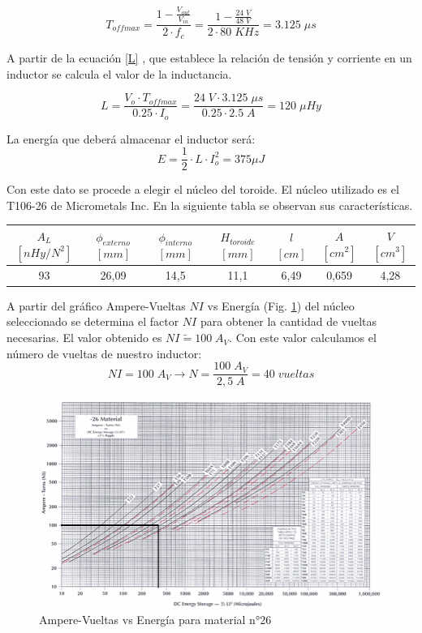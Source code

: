 \documentclass[11pt, a4paper]{article}
\begin{document}
\begin{equation}
T_{offmax} = \frac{1 - \frac{V_{out}}{V_{in}}}{2\cdot f_c} = \frac{1 - \frac{24 \; V}{48 \; V}}{2\cdot 80 \; KHz} = 3.125 \; \mu s
\label{toff}
\end{equation}

A partir de la ecuación \ref{L} , que establece la relación de tensión y corriente en un inductor se calcula el valor de la inductancia.

\begin{equation}
L = \frac{V_o \cdot T_{offmax}}{0.25 \cdot I_o} = \frac{24 \; V \cdot 3.125 \; \mu s}{0.25 \cdot 2.5 \; A} = 120 \; \mu Hy
\label{L}
\end{equation}

La energía que deberá almacenar el inductor será:
\[ E = \frac{1}{2} \cdot L \cdot I_{o}^{2} = 375 \mu J \]

Con este dato se procede a elegir el núcleo del toroide. El núcleo utilizado es el T106-26 de Micrometals Inc. En la siguiente tabla se observan sus características.
\begin{center}
	\begin{tabular}[h]{||c|c|c|c|c|c|c||}
		\hline
		$A_L$ $[nHy/N^2]$ & $\phi_{externo}$ $[mm]$ & $\phi_{interno}$ $[mm]$ & $H_{toroide}$ $[mm]$ & $\mathit{l}$ $[cm]$ & $A$ $[cm^2]$ & $V$ $[cm^3]$ \\
		\hline
		93 & 26,09 & 14,5 & 11,1 & 6,49 & 0,659 & 4,28 \\
		\hline
	\end{tabular}
\end{center}

A partir del gráfico Ampere-Vueltas $NI$ vs Energía (Fig. \ref{NIvsE}) del núcleo seleccionado se determina el factor $NI$ para obtener la cantidad de vueltas necesarias. El valor obtenido es $NI \tilde{=} 100 \; A_V$. Con este valor calculamos el número de vueltas de nuestro inductor:
\[NI = 100 \; A_V \rightarrow N = \frac{100 \; A_V}{2,5 \; A} = 40 \; vueltas\]

\begin{figure}[h]
	\centering
	\includegraphics[width = 12 cm]{Imagenes/NIvsE}
	\caption{Ampere-Vueltas vs Energía para material n°26}
	\label{NIvsE}
\end{figure}
\end{document}
